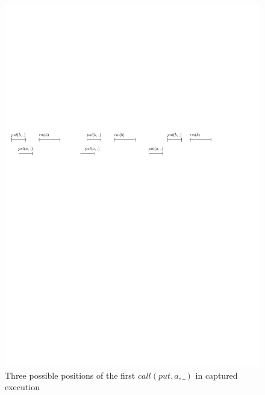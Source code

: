 \begin{figure}[htbp]
  \centering
  \includegraphics[width=1 \textwidth]{figures/PIC_HIS_PQ1Lar-pprr-in-paper.pdf}
  \caption{Three possible positions of the first $\textit{call}(\textit{put},a,\_)$ in captured execution}
  \label{fig:executions APQ1Lar-1 in paper}
\end{figure}


%



